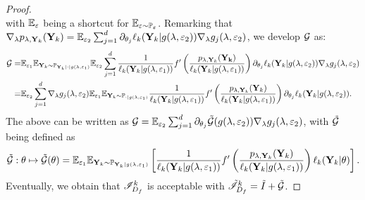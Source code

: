\begin{proof}
\begin{equation}
        \end{equation}
        with $\mathbb{E}_\varepsilon$ being a shortcut for $\mathbb{E}_{\varepsilon\sim\mathbb{P}_\varepsilon}$.
        Remarking that $\nabla_\lambda p_{\lambda,\mathbf{Y}_k}(\mathbf{Y}_k) = \mathbb{E}_{\varepsilon_2}\sum_{j=1}^d\partial_{\theta_j}\ell_k(\mathbf{Y}_k|g(\lambda,\varepsilon_2))\nabla_\lambda g_j(\lambda,\varepsilon_2) $, we develop $\mathcal{G}$ as:
        \begin{align}
            \mathcal{G} = &\mathbb{E}_{\varepsilon_1}\mathbb{E}_{\mathbf{Y}_k\sim \mathbb{P}_{\mathbf{Y}_k|\cdot|g(\lambda,\varepsilon_1)}}\mathbb{E}_{\varepsilon_2}\sum_{j=1}^d\frac{1}{\ell_k(\mathbf{Y}_k|g(\lambda,\varepsilon_1))} f'\left(\frac{p_{\lambda,\mathbf{Y}_k}(\mathbf{Y_k})}{\ell_k(\mathbf{Y}_k|g(\lambda,\varepsilon_1))}  \right)\partial_{\theta_j} \ell_k(\mathbf{Y}_k|g(\lambda,\varepsilon_2)) \nabla_\lambda g_j(\lambda,\varepsilon_2)\\
            =& \mathbb{E}_{\varepsilon_2}\sum_{j=1}^d\nabla_\lambda g_j(\lambda,\varepsilon_2) \mathbb{E}_{\varepsilon_1}\mathbb{E}_{\mathbf{Y}_k\sim \mathbb{P}_{\cdot|g(\lambda,\varepsilon_1)}} \frac{1}{\ell_k(\mathbf{Y}_k|g(\lambda,\varepsilon_1))} f'\left(\frac{p_{\lambda,\mathbf{Y}_k}(\mathbf{Y}_k)}{\ell_k(\mathbf{Y}_k|g(\lambda,\varepsilon_1))}  \right) \partial_{\theta_j} \ell_k(\mathbf{Y}_k|g(\lambda,\varepsilon_2)).\nonumber
        \end{align}
    The above can be written as $\mathcal{G}=\mathbb{E}_{\varepsilon_2}\sum_{j=1}^d\partial_{\theta_j}\tilde{\mathcal{G}}(g(\lambda,\varepsilon_2))\nabla_\lambda g_j(\lambda,\varepsilon_2)$, with $\tilde{\mathcal{G}}$ being defined as
        \begin{equation}
        \tilde{\mathcal{G}}:\theta\mapsto\tilde{\mathcal{G}}(\theta) = \mathbb{E}_{\varepsilon_1}\mathbb{E}_{\mathbf{Y}_k\sim\mathbb{P}_{\mathbf{Y}_k|g(\lambda,\varepsilon_1)}}\left[ \frac{1}{\ell_k(\mathbf{Y}_k|g(\lambda,\varepsilon_1))}f'\left(\frac{p_{\lambda,\mathbf{Y}_k}(\mathbf{Y}_k)}{\ell_k(\mathbf{Y}_k|g(\lambda,\varepsilon_1))}\right)\ell_k(\mathbf{Y}_k|\theta) \right].
        \end{equation}
    Eventually, we obtain that $\mathscr{I}^k_{D_f}$ is acceptable with $\tilde{\mathscr{I}}^k_{D_f} =\tilde I+\tilde{\mathcal{G}}$.
\end{proof}


